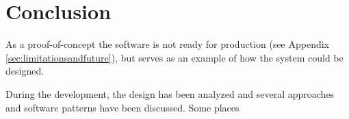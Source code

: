 \section{Conclusion}
As a proof-of-concept the \SOP{} software is not ready for production (see Appendix \ref{sec:limitationsandfuture}), but
serves as an example of how the system could be designed.

During the development, the design has been analyzed and several approaches and software patterns have been
discussed.
Some places 
